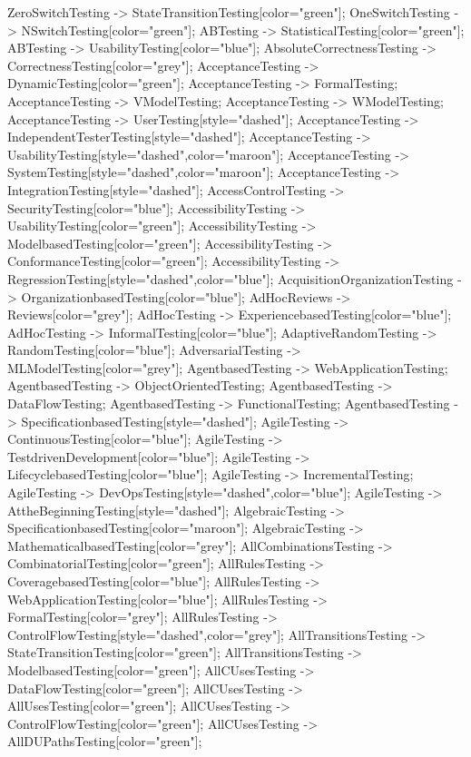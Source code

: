 \documentclass{article}
\begin{document}
{ZeroSwitchTesting -> StateTransitionTesting[color="green"];
OneSwitchTesting -> NSwitchTesting[color="green"];
ABTesting -> StatisticalTesting[color="green"];
ABTesting -> UsabilityTesting[color="blue"];
AbsoluteCorrectnessTesting -> CorrectnessTesting[color="grey"];
AcceptanceTesting -> DynamicTesting[color="green"];
AcceptanceTesting -> FormalTesting;
AcceptanceTesting -> VModelTesting;
AcceptanceTesting -> WModelTesting;
AcceptanceTesting -> UserTesting[style="dashed"];
AcceptanceTesting -> IndependentTesterTesting[style="dashed"];
AcceptanceTesting -> UsabilityTesting[style="dashed",color="maroon"];
AcceptanceTesting -> SystemTesting[style="dashed",color="maroon"];
AcceptanceTesting -> IntegrationTesting[style="dashed"];
AccessControlTesting -> SecurityTesting[color="blue"];
AccessibilityTesting -> UsabilityTesting[color="green"];
AccessibilityTesting -> ModelbasedTesting[color="green"];
AccessibilityTesting -> ConformanceTesting[color="green"];
AccessibilityTesting -> RegressionTesting[style="dashed",color="blue"];
AcquisitionOrganizationTesting -> OrganizationbasedTesting[color="blue"];
AdHocReviews -> Reviews[color="grey"];
AdHocTesting -> ExperiencebasedTesting[color="blue"];
AdHocTesting -> InformalTesting[color="blue"];
AdaptiveRandomTesting -> RandomTesting[color="blue"];
AdversarialTesting -> MLModelTesting[color="grey"];
AgentbasedTesting -> WebApplicationTesting;
AgentbasedTesting -> ObjectOrientedTesting;
AgentbasedTesting -> DataFlowTesting;
AgentbasedTesting -> FunctionalTesting;
AgentbasedTesting -> SpecificationbasedTesting[style="dashed"];
AgileTesting -> ContinuousTesting[color="blue"];
AgileTesting -> TestdrivenDevelopment[color="blue"];
AgileTesting -> LifecyclebasedTesting[color="blue"];
AgileTesting -> IncrementalTesting;
AgileTesting -> DevOpsTesting[style="dashed",color="blue"];
AgileTesting -> AttheBeginningTesting[style="dashed"];
AlgebraicTesting -> SpecificationbasedTesting[color="maroon"];
AlgebraicTesting -> MathematicalbasedTesting[color="grey"];
AllCombinationsTesting -> CombinatorialTesting[color="green"];
AllRulesTesting -> CoveragebasedTesting[color="blue"];
AllRulesTesting -> WebApplicationTesting[color="blue"];
AllRulesTesting -> FormalTesting[color="grey"];
AllRulesTesting -> ControlFlowTesting[style="dashed",color="grey"];
AllTransitionsTesting -> StateTransitionTesting[color="green"];
AllTransitionsTesting -> ModelbasedTesting[color="green"];
AllCUsesTesting -> DataFlowTesting[color="green"];
AllCUsesTesting -> AllUsesTesting[color="green"];
AllCUsesTesting -> ControlFlowTesting[color="green"];
AllCUsesTesting -> AllDUPathsTesting[color="green"];
}
\end{document}
